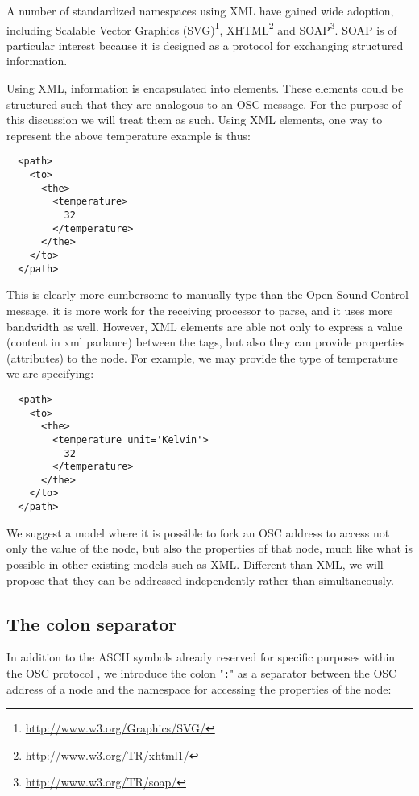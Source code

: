 \documentclass{sig-alternate}
\begin{document}
A number of standardized namespaces using XML have gained wide adoption, including Scalable Vector Graphics (SVG)\footnote{\url{http://www.w3.org/Graphics/SVG/}}, XHTML\footnote{\url{http://www.w3.org/TR/xhtml1/}} and SOAP\footnote{\url{http://www.w3.org/TR/soap/}}.  SOAP is of particular interest because it is designed as a protocol for exchanging structured information.

Using XML, information is encapsulated into elements.  These elements could be structured such that they are analogous to an OSC message. For the purpose of this discussion we will treat them as such.  Using XML elements, one way to represent the above temperature example is thus:

\begin{lstlisting}
  <path>
    <to>
      <the>
        <temperature> 
          32
        </temperature>
      </the>
    </to>
  </path>
\end{lstlisting}

This is clearly more cumbersome to manually type than the Open Sound Control message, it is more work for the receiving processor to parse, and it uses more bandwidth as well. However, XML elements are able not only to express a value (content in xml parlance) between the tags, but also they can provide properties (attributes) to the node. For example, we may provide the type of temperature we are specifying:

\begin{lstlisting}
  <path>
    <to>
      <the>
        <temperature unit='Kelvin'>
          32
        </temperature>
      </the>
    </to>
  </path>
\end{lstlisting}

We suggest a model where it is possible to fork an OSC address to access not only the value of the node, but also the properties of that node, much like what is possible in other existing models such as XML.  Different than XML, we will propose that they can be addressed independently rather than simultaneously.


\subsection{The colon separator} %
\label{sub:the_colon_separator}

In addition to the ASCII symbols already reserved for specific purposes within the OSC protocol \cite{Wright:1997}, we introduce the colon "\texttt{:}" as a separator between the OSC address of a node and the namespace for accessing the properties of the node:
\end{document}
